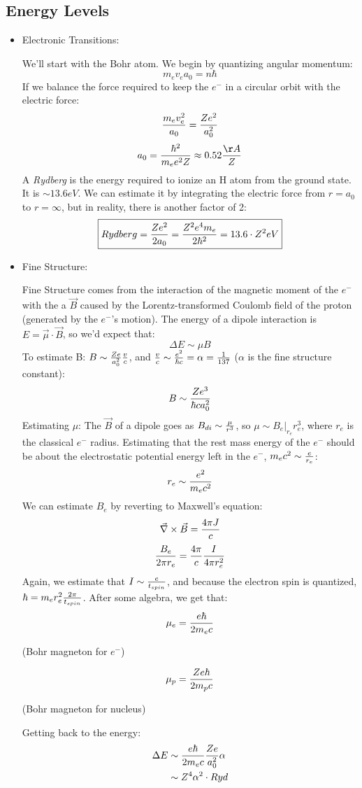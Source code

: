 \documentclass[11pt]{article}
\def\inv#1{{1 \over #1}}
\def\eval#1{\big|_{#1}}
\def\tr{\nabla}
\def\dcb{\vec\tr\times\vec B}
\def\bfield{{\vec B}}
\begin{document}
\subsection*{Energy Levels}
\begin{itemize}
\item Electronic Transitions:\par
We'll start with the Bohr atom.  We begin by quantizing angular momentum:
$$m_ev_ea_0=n\hbar$$
If we balance the force required to keep the $e^-$ in a circular orbit
with the electric force:
$${m_ev_e^2\over a_0}={Ze^2\over a_0^2}$$
$$a_0={\hbar^2\over m_ee^2Z}\approx0.52{\AA\over Z}$$
A {\it Rydberg} is the energy required to ionize an H atom from the ground
state.  It is $\sim13.6eV$.  We can estimate it by integrating the electric
force from $r=a_0$ to $r=\infty$, but in reality, there is another factor of
2:
$$\boxed{Rydberg={Ze^2\over2a_0}={Z^2e^4m_e\over2\hbar^2}=13.6\cdot Z^2eV}$$
\item Fine Structure:\par
Fine Structure comes from the interaction of the magnetic moment of the $e^-$
with the a $\bfield$ caused by the
Lorentz-transformed Coulomb field of the proton (generated by the $e^-$'s 
motion).  The 
energy of a dipole interaction is $E=\vec\mu\cdot\bfield$, so we'd expect
that:
$$\Delta E\sim\mu B$$
To estimate B: $B\sim{Ze\over a_0^2}{v\over c}$, and ${v\over c}\sim
{e^2\over\hbar c}=\alpha=\inv{137}$ ($\alpha$ is the fine structure constant):
$$B\sim{Ze^3\over\hbar ca_0^2}$$
Estimating $\mu$: The $\bfield$ of a dipole goes as $B_{di}\sim{\mu\over r^3}$,
so $\mu\sim B_e\eval{r_e}r_e^3$, where $r_e$ is the classical $e^-$ radius.
Estimating that the rest mass energy of the $e^-$ should be about the 
electrostatic potential energy left in the $e^-$, $m_ec^2\sim{e\over r_e}$:
$$r_e\sim{e^2\over m_ec^2}$$
We can estimate $B_e$ by reverting to Maxwell's equation:
$$\dcb={4\pi J\over c}$$
$${B_e\over2\pi r_e}={4\pi\over c}{I\over4\pi r_e^2}$$
Again, we estimate that $I\sim{e\over t_{spin}}$, and because the electron
spin is quantized, $\hbar=m_er_e^2{2\pi\over t_{spin}}$.
After some algebra, we get that:
$$\mu_e={e\hbar\over2m_ec}$$
\centerline{(Bohr magneton for $e^-$)}
$$\mu_p={Ze\hbar\over2m_pc}$$
\centerline{(Bohr magneton for nucleus)}
Getting back to the energy:
$$\begin{aligned}\Delta E&\sim{e\hbar\over2m_ec}{Ze\over a_0^2}\alpha\\ 
&\sim Z^4\alpha^2\cdot Ryd\\ \end{aligned}$$


\end{itemize}
\end{document}
